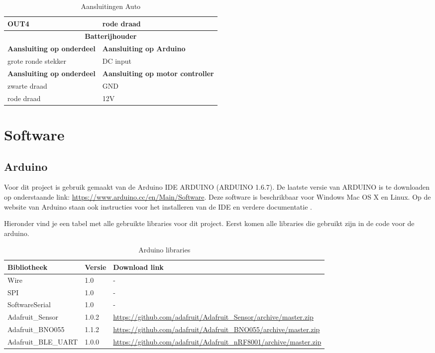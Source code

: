 \documentclass[12pt,a4paper]{article}
\begin{document}
\begin{table}[H]
\begin{tabularx}{\textwidth}{|X|X|}
			\hline OUT4 & rode draad \\
			\hline \multicolumn{2}{|c|}{\textbf{Batterijhouder}}\\	 
			\hline \textbf{Aansluiting op onderdeel} & \textbf{Aansluiting op Arduino} \\
			\hline grote ronde stekker & DC input \\
			\hline \textbf{Aansluiting op onderdeel} & \textbf{Aansluiting op motor controller} \\
			\hline zwarte draad & GND \\
			\hline rode draad & 12V \\		
			\hline		
		\end{tabularx} 
		\caption{Aansluitingen Auto}
		\label{tbl:Aansluitingen_auto}
	\end{table}

\section{Software}
\subsection{Arduino}
Voor dit project is gebruik gemaakt van de Arduino IDE ARDUINO (ARDUINO 1.6.7). De laatste versie van ARDUINO is te downloaden op onderstaande link: \url{https://www.arduino.cc/en/Main/Software}. Deze software is beschrikbaar voor Windows Mac OS X en Linux. Op de website van Arduino staan ook instructies voor het installeren van de IDE en verdere documentatie \cite{ARDUINO_getting started}.

Hieronder vind je een tabel met alle gebruikte libraries voor dit project.
Eerst komen alle libraries die gebruikt zijn in de code voor de arduino.

\begin{table}[H]
	\begin{tabularx}{\textwidth}{|l|l|X|}
	\hline \textbf{Bibliotheek} & \textbf{Versie} & \textbf{Download link}  \\ 
	\hline Wire & 1.0 & - \\ 
	\hline SPI & 1.0 & - \\ 
	\hline SoftwareSerial & 1.0 & - \\ 
	\hline Adafruit\_Sensor & 1.0.2 &  \url{https://github.com/adafruit/Adafruit_Sensor/archive/master.zip}  \\ 
	\hline Adafruit\_BNO055 & 1.1.2 & \url{https://github.com/adafruit/Adafruit_BNO055/archive/master.zip} \\ 
	\hline Adafruit\_BLE\_UART & 1.0.0 & \url{https://github.com/adafruit/Adafruit_nRF8001/archive/master.zip }\\ 
	\hline		
	\end{tabularx} 
	\caption{Arduino libraries}
	\label{tbl:Download_link}
\end{table}
\end{document}
